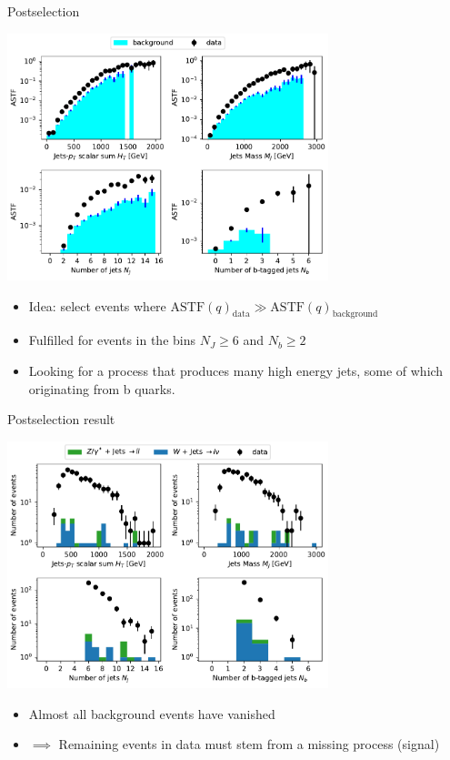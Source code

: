 \documentclass{beamer}
\begin{document}
\begin{frame}{Postselection}
\begin{center}
\includegraphics[width=0.7\textwidth]{astf.pdf}
\end{center}

\begin{itemize}
    \item<1-> Idea: select events where $\text{ASTF}(q)_{\text{data}} \gg \text{ASTF}(q)_{\text{background}}$
    \item<2-> Fulfilled for events in the bins $N_J\geq 6$ and $N_b\geq 2$
    \item<3-> Looking for a process that produces many high energy jets, some of which originating from b quarks.
\end{itemize}
\end{frame}

\begin{frame}{Postselection result}
\begin{center}
\includegraphics[width=0.7\textwidth]{post_b.pdf}
\end{center}

\begin{itemize}
    \item<1-> Almost all background events have vanished
    \item<2-> $\implies$ Remaining events in data must stem from a missing process (signal)
\end{itemize}
\end{frame}
\end{document}
